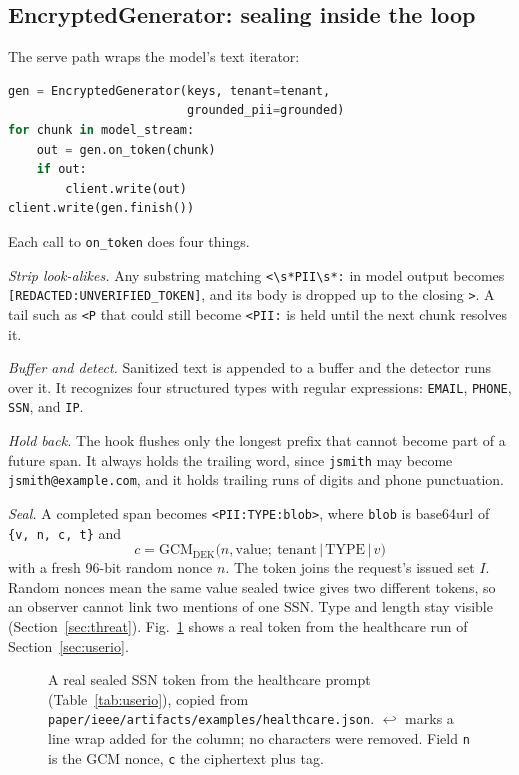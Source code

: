 \documentclass[conference]{IEEEtran}
\newcommand{\code}[1]{\texttt{#1}}
\begin{document}
\subsection{EncryptedGenerator: sealing inside the loop}
\label{sec:generator}

The serve path wraps the model's text iterator:
\begin{lstlisting}[language=Python]
gen = EncryptedGenerator(keys, tenant=tenant,
                         grounded_pii=grounded)
for chunk in model_stream:
    out = gen.on_token(chunk)
    if out:
        client.write(out)
client.write(gen.finish())
\end{lstlisting}
Each call to \code{on\_token} does four things.

\emph{Strip look-alikes.} Any substring matching \lstinline!<\s*PII\s*:! in model output becomes \code{[REDACTED:UNVERIFIED\_TOKEN]}, and its body is dropped up to the closing \code{>}. A tail such as \code{<P} that could still become \code{<PII:} is held until the next chunk resolves it.

\emph{Buffer and detect.} Sanitized text is appended to a buffer and the detector runs over it. It recognizes four structured types with regular expressions: \code{EMAIL}, \code{PHONE}, \code{SSN}, and \code{IP}.

\emph{Hold back.} The hook flushes only the longest prefix that cannot become part of a future span. It always holds the trailing word, since \code{jsmith} may become \code{jsmith@example.com}, and it holds trailing runs of digits and phone punctuation.

\emph{Seal.} A completed span becomes \code{<PII:TYPE:blob>}, where \code{blob} is base64url of \code{\{v, n, c, t\}} and
\begin{equation}
  c = \mathrm{GCM}_{\mathrm{DEK}}\big(n, \text{value};\ \text{tenant}\,|\,\text{TYPE}\,|\,v\big)
  \label{eq:seal}
\end{equation}
with a fresh 96-bit random nonce $n$. The token joins the request's issued set $I$. Random nonces mean the same value sealed twice gives two different tokens, so an observer cannot link two mentions of one SSN. Type and length stay visible (Section~\ref{sec:threat}). Fig.~\ref{fig:token} shows a real token from the healthcare run of Section~\ref{sec:userio}.

\begin{figure}[!t]

\caption{A real sealed SSN token from the healthcare prompt (Table~\ref{tab:userio}), copied from \code{paper/ieee/artifacts/examples/healthcare.json}. $\hookleftarrow$ marks a line wrap added for the column; no characters were removed. Field \code{n} is the GCM nonce, \code{c} the ciphertext plus tag.}
\label{fig:token}
\end{figure}
\end{document}

